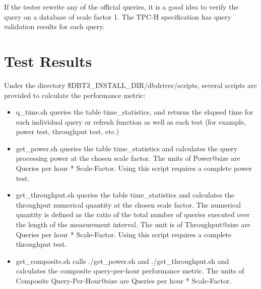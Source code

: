 \documentclass{article}
\begin{document}
\noindent
If the tester rewrite any of the official queries, it is a good idea
to verify the query on a database of scale factor 1.  The TPC-H
specification has query validation results for each query.

\section{Test Results}

\noindent
Under the directory \$DBT3\_INSTALL\_DIR/dbdriver/scripts, several
scripts are provided to calculate the performance metric: \\
\begin{itemize}
\item q\_time.sh queries the table time\_statistics, and returns the elapsed time for each individual query or refresh function  as well as each test (for example, power test, throughput test, etc.)
\item get\_power.sh  queries the table time\_statistics and calculates the query processing power at the chosen scale factor.  The units of Power@size are Queries per hour * Scale-Factor.  Using this script requires a complete power test.
\item get\_throughput.sh queries the table time\_statistics and calculates the throughput numerical quantity at the chosen scale factor.  The  numerical quantity is defined as the ratio of the total number of queries executed over the length of the measurement interval.  The unit is of Throughput@size are Queries per hour * Scale-Factor.  Using this script requires a complete throughput test.
\item get\_composite.sh calls ./get\_power.sh and ./get\_throughput.sh and calculates the composite query-per-hour performance metric.  The units of Composite Query-Per-Hour@size are Queries per hour * Scale-Factor.
\end{itemize}
\end{document}
